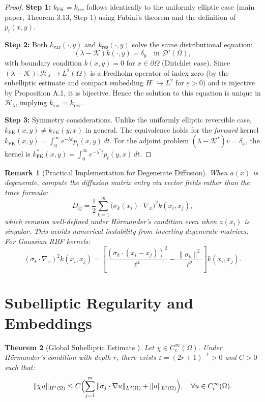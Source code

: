 \documentclass[11pt,a4paper]{article}
\newtheorem{theorem}{Theorem}[section]
\newtheorem{remark}[theorem]{Remark}
\begin{document}
\begin{proof}
\textbf{Step 1:} $k_{\mathrm{FK}} = k_{\mathrm{res}}$ follows identically to the uniformly elliptic case (main paper, Theorem 3.13, Step 1) using Fubini's theorem and the definition of $p_t(x,y)$.

\textbf{Step 2:} Both $k_{\mathrm{var}}(\cdot,y)$ and $k_{\mathrm{res}}(\cdot,y)$ solve the same distributional equation:
\[
(\lambda - \mathcal{K})k(\cdot,y) = \delta_y \quad \text{in } \mathcal{D}'(\Omega),
\]
with boundary condition $k(x,y) = 0$ for $x \in \partial\Omega$ (Dirichlet case). Since $(\lambda - \mathcal{K}): \mathcal{H}_\lambda \to L^2(\Omega)$ is a Fredholm operator of index zero (by the subelliptic estimate and compact embedding $H^\varepsilon \hookrightarrow L^2$ for $\varepsilon > 0$) and is injective by Proposition A.1, it is bijective. Hence the solution to this equation is unique in $\mathcal{H}_\lambda$, implying $k_{\mathrm{var}} = k_{\mathrm{res}}$.

\textbf{Step 3:} Symmetry considerations. Unlike the uniformly elliptic reversible case, $k_{\mathrm{FK}}(x,y) \neq k_{\mathrm{FK}}(y,x)$ in general. The equivalence holds for the \emph{forward} kernel $k_{\mathrm{FK}}(x,y) = \int_0^\infty e^{-\lambda t}p_t(x,y)\,dt$. For the adjoint problem $(\lambda - \mathcal{K}^*)v = \delta_x$, the kernel is $k_{\mathrm{FK}}^*(x,y) = \int_0^\infty e^{-\lambda^* t}p_t(y,x)\,dt$.
\end{proof}

\begin{remark}[Practical Implementation for Degenerate Diffusion]
When $a(x)$ is degenerate, compute the diffusion matrix entry via vector fields rather than the trace formula:
\[
D_{ij} = \frac{1}{2}\sum_{k=1}^m \bigl(\sigma_k(x_i)\cdot\nabla_x\bigr)^2 k(x_i,x_j),
\]
which remains well-defined under H\"{o}rmander's condition even when $a(x_i)$ is singular. This avoids numerical instability from inverting degenerate matrices. For Gaussian RBF kernels:
\[
(\sigma_k \cdot \nabla_x)^2 k(x_i,x_j) = \left[\frac{(\sigma_k \cdot (x_i-x_j))^2}{\ell^4} - \frac{\|\sigma_k\|^2}{\ell^2}\right] k(x_i,x_j).
\]
\end{remark}

\section{Subelliptic Regularity and Embeddings}

\begin{theorem}[Global Subelliptic Estimate \cite{RothschildStein1976}]
Let $\chi \in C_c^\infty(\Omega)$. Under H\"{o}rmander's condition with depth $r$, there exists $\varepsilon = (2r+1)^{-1} > 0$ and $C > 0$ such that:
\[
\|\chi u\|_{H^\varepsilon(\Omega)} \leq C\Bigl(\sum_{j=1}^m \|\sigma_j \cdot \nabla u\|_{L^2(\Omega)} + \|u\|_{L^2(\Omega)}\Bigr),
\quad \forall u \in C_c^\infty(\Omega).
\]
\end{theorem}
\end{document}
